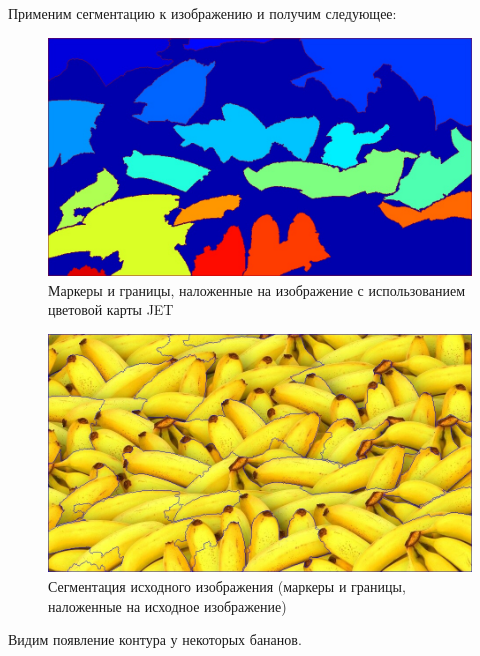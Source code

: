 \documentclass[a4paper, 12pt]{article}
\begin{document}
    Применим сегментацию к изображению и получим следующее:
    \begin{figure}[H]
        \centering
        \includegraphics[scale=0.2]{seg_new_mj.jpg}
        \captionsetup{skip=0pt}
        \caption{Маркеры и границы, наложенные на изображение
        с использованием цветовой карты JET}
        \label{fig:segnj}
    \end{figure}
    \begin{figure}[H]
        \centering
        \includegraphics[scale=0.2]{seg_new.jpg}
        \captionsetup{skip=0pt}
        \caption{Сегментация исходного изображения (маркеры и границы, наложенные на исходное изображение)}
        \label{fig:segn}
    \end{figure}
    Видим появление контура у некоторых бананов.
\end{document}
